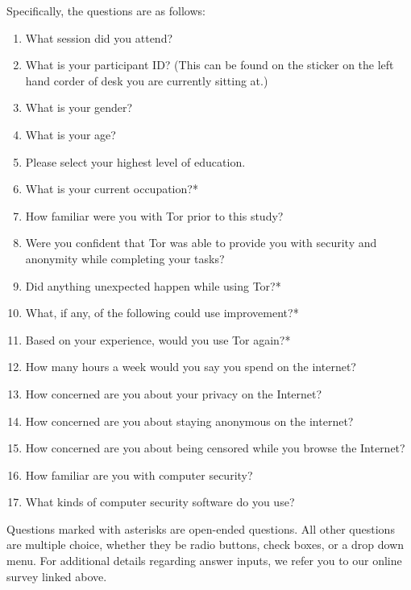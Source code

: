 \documentclass[letterpaper,twocolumn,11pt]{article}
\begin{document}
\noindent Specifically, the questions are as follows: 
\begin{enumerate} \itemsep1pt \parskip0pt 
\item What session did you attend?  
\item What is your participant ID? (This can be found on the sticker on the left hand corder of desk you are currently sitting at.) 
\item What is your gender? 
\item What is your age? 
\item Please select your highest level of education. 
\item What is your current occupation?*
\item How familiar were you with Tor prior to this study? 
\item Were you confident that Tor was able to provide you with security and anonymity while completing your tasks?
\item Did anything unexpected happen while using Tor?*
\item What, if any, of the following could use improvement?*
\item Based on your experience, would you use Tor again?*
\item How many hours a week would you say you spend on the internet? 
\item How concerned are you about your privacy on the Internet?
\item How concerned are you about staying anonymous on the internet?
\item How concerned are you about being censored while you browse the Internet? 
\item How familiar are you with computer security? 
\item What kinds of computer security software do you use? 
\end{enumerate}

Questions marked with asterisks are open-ended questions. All other questions are multiple choice, whether they be radio buttons, check boxes, or a drop down menu. For additional details regarding answer inputs, we refer you to our online survey linked above. 


 
\end{document}
